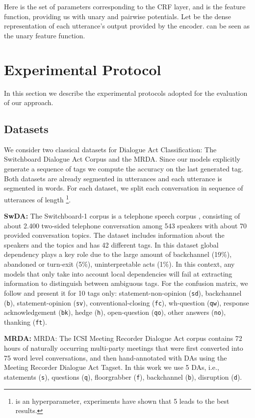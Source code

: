\documentclass[letterpaper]{article} \usepackage{aaai20}  \usepackage{times}  \usepackage{helvet} \usepackage{courier}  \usepackage[hyphens]{url}  \usepackage{graphicx} \urlstyle{rm} \def\UrlFont{\rm}  \usepackage{graphicx}  \frenchspacing  \setlength{\pdfpagewidth}{8.5in}  \setlength{\pdfpageheight}{11in}
\newcommand{\citet}[1]{\citeauthor{#1} \shortcite{#1}}
\begin{document}
Here  is the set of parameters corresponding to the CRF layer, and  is the feature function, providing us with unary and pairwise potentials. Let  be the dense representation of each utterance's output provided by the encoder.  can be seen as the unary feature function.

\section{Experimental Protocol}
In this section we describe the experimental protocols adopted for the evaluation of our approach.

\subsection{Datasets} \label{ssec:datasets}


We consider two classical datasets for Dialogue Act Classification: The Switchboard Dialogue Act Corpus and the MRDA. Since our models explicitly generate a sequence of tags we compute the accuracy on the last generated tag.
Both datasets are already segmented in utterances and each utterance is segmented in words.
For each dataset, we split each conversation  in sequence of utterances of length \footnote{ is an hyperparameter, experiments have shown that 5 leads to the best results.}.


\noindent\textbf{SwDA:} The Switchboard-1 corpus is a telephone speech corpus \cite{switchboard_da}, consisting of about 2.400 two-sided telephone conversation among 543 speakers with about 70 provided conversation topics. The dataset includes information about the speakers and the topics and has 42 different tags.
In this dataset global dependency plays a key role due to the large amount of backchannel (19\%), abandoned or turn-exit (5\%), uninterpretable acts (1\%). In this context, any models that only take into account local dependencies will fail at extracting information to distinguish between ambiguous tags. 
For the confusion matrix, we follow \citet{crf_multi_task} and present it for 10 tags only: statement-non-opinion (\texttt{sd}), backchannel (\texttt{b}), statement-opinion (\texttt{sv}), conventional-closing (\texttt{fc}), wh-question (\texttt{qw}), response acknowledgement (\texttt{bk}), hedge (\texttt{h}), open-question (\texttt{qo}), other answers (\texttt{no}), thanking (\texttt{ft}).

\noindent\textbf{MRDA:} MRDA: The ICSI Meeting Recorder Dialogue Act corpus \cite{mrda_2} contains 72 hours of naturally occurring multi-party meetings that were first converted into 75 word level conversations, and then hand-annotated with DAs using the Meeting Recorder Dialogue Act Tagset. In this work we use 5 DAs, i.e., statements (\texttt{s}), questions (\texttt{q}), floorgrabber (\texttt{f}), backchannel (\texttt{b}), disruption (\texttt{d}).
\end{document}
